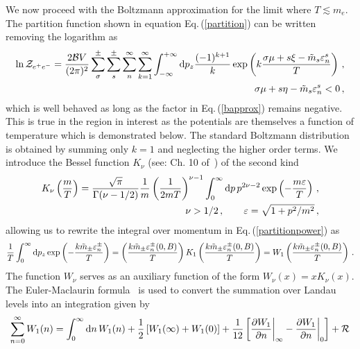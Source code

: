\documentclass[a4paper]{article}
\newcommand{\req}[1]{Eq.\,(\ref{#1})}
\begin{document}
We now proceed with the Boltzmann approximation for the limit where $T\lesssim m_e$. The partition function shown in equation \req{partition} can be written removing the logarithm as
\begin{align}
    \label{partitionpower}
    \ln{{\cal Z}_{e^{+}e^{-}}}=\frac{2{\cal B}V}{(2\pi)^{2}}\sum_{\sigma}^{\pm}\sum_{s}^{\pm}\sum_{n}^{\infty}\sum_{k=1}^{\infty}\int_{-\infty}^{+\infty}{\rm d}p_{z}\frac{(-1)^{k+1}}{k}\exp\left({k\frac{\sigma\mu+s\xi-{\tilde m}_{s}\varepsilon^{s}_{n}}{T}}\right)\,,\\
    \label{bapprox}
     \sigma\mu+s\eta-{\tilde m}_{s}\varepsilon_{n}^{s}<0\,,
\end{align}
which is well behaved as long as the factor in \req{bapprox} remains negative. This is true in the region in interest as the potentials are themselves a function of temperature which is demonstrated below. The standard Boltzmann distribution is obtained by summing only $k=1$ and neglecting the higher order terms. We introduce the Bessel function $K_{\nu}$ (see: Ch. 10 of~\cite{letessier2002hadrons}) of the second kind
\begin{align}
    \label{besselk}
    K_{\nu}\left(\frac{m}{T}\right)=\frac{\sqrt{\pi}}{\Gamma(\nu-1/2)}\frac{1}{m}\left(\frac{1}{2mT}\right)^{\nu-1}\int_{0}^{\infty}{\rm d}p\,p^{2\nu-2}\exp\left({-\frac{m\varepsilon}{T}}\right)\,,\\
    \nu>1/2\,,\qquad\varepsilon=\sqrt{1+p^{2}/m^{2}}\,,
\end{align}
allowing us to rewrite the integral over momentum in \req{partitionpower} as
\begin{align}
    \label{besselkint}
    \frac{1}{T}\int_{0}^{\infty}{\rm d}p_{z}\exp\left({-\frac{k{\tilde m}_{\pm}\varepsilon_{n}^{\pm}}{T}}\right)=\left(\frac{k{\tilde m}_{\pm}\varepsilon_{n}^{\pm}(0,B)}{T}\right)K_{1}\left(\frac{k{\tilde m}_{\pm}\varepsilon_{n}^{\pm}(0,B)}{T}\right)=W_{1}\left(\frac{k{\tilde m}_{\pm}\varepsilon_{n}^{\pm}(0,B)}{T}\right)\,.
\end{align}
The function $W_{\nu}$ serves as an auxiliary function of the form $W_{\nu}(x)=xK_{\nu}(x)$. The Euler-Maclaurin formula~\cite{abramowitz1988handbook} is used to convert the summation over Landau levels into an integration given by
\begin{align}
    \label{eulermaclaurin}
    \sum_{n=0}^{\infty}W_{1}(n)=\int_{0}^{\infty}{\rm d}n\,W_{1}(n)+\frac{1}{2}\left[W_{1}(\infty)+W_{1}(0)\right]+\frac{1}{12}\left[\frac{\partial W_{1}}{\partial n}\bigg\vert_{\infty}-\frac{\partial W_{1}}{\partial n}\bigg\vert_{0}\right]+{\cal R}
\end{align}
\end{document}
